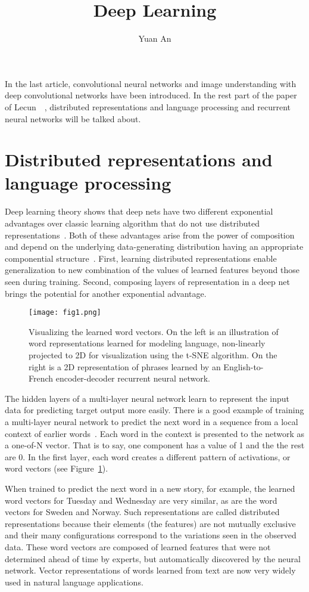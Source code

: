 \documentclass[10pt,twocolumn,letterpaper]{article}
\begin{document}
	\title{Deep Learning}	
	\author{Yuan An}
	\maketitle
	In the last article, convolutional neural networks and image understanding with deep convolutional networks have been introduced. In the rest part of the paper of Lecun~\etal~\cite{DeepLearning}, distributed representations and language processing and recurrent neural networks will be talked about.
	\par
	\section*{Distributed representations and language processing}
	Deep learning theory shows that deep nets have two different exponential advantages over classic learning algorithm that do not use distributed representations~\cite{Bengio2005The}. Both of these advantages arise from the power of composition and depend on the underlying data-generating distribution having an appropriate componential structure~\cite{Bengio2013Representation}. First, learning distributed representations enable generalization to new combination of the values of learned features beyond those seen during training. Second, composing layers of representation in a deep net brings the potential for another exponential advantage.
	\begin{figure}[h]
		\centering
		\texttt{[image: fig1.png]}
		\caption{Visualizing the learned word vectors. On the left is an illustration of word representations learned for modeling language, non-linearly projected to 2D for visualization using the t-SNE algorithm. On the right is a 2D representation of phrases learned by an English-to-French encoder-decoder recurrent neural network.} \label{fig1}
	\end{figure}
	\par
	The hidden layers of a multi-layer neural network learn to represent the input data for predicting target output more easily. There is a good example of training a multi-layer neural network to predict the next word in a sequence from a local context of earlier words~\cite{Bengio2003A}. Each word in the context is presented to the network as a one-of-N vector. That is to say, one component has a value of 1 and the the rest are 0. In the first layer, each word creates a different pattern of activations, or word vectors (see Figure~\ref{fig1}).
	\par
	When trained to predict the next word in a new story, for example, the learned word vectors for Tuesday and Wednesday are very similar, as are the word vectors for Sweden and Norway. Such representations are called distributed representations because their elements (the features) are not mutually exclusive and their many configurations correspond to the variations seen in the observed data. These word vectors are composed of learned features that were not determined ahead of time by experts, but automatically discovered by the neural network. Vector representations of words learned from text are now very widely used in natural language applications.
\end{document}
